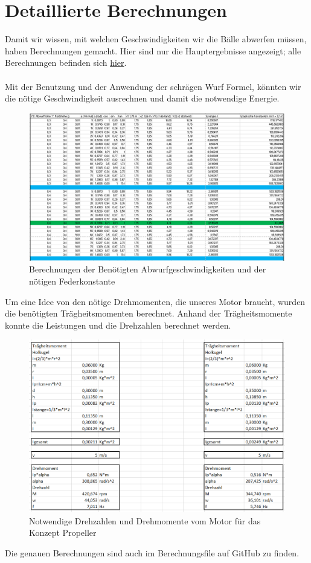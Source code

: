 \section{Detaillierte Berechnungen}
\label{anhang-Berechnungen}
Damit wir wissen, mit welchen Geschwindigkeiten wir die Bälle abwerfen müssen, haben Berechnungen gemacht.
Hier sind nur die Hauptergebnisse angezeigt; alle Berechnungen befinden sich \href{https://github.com/accefa/doku/tree/master/bin/Berechnungen.xlsx}{hier}. \\ \\
Mit der Benutzung und der Anwendung der schrägen Wurf Formel, könnten wir die nötige Geschwindigkeit ausrechnen und damit die notwendige Energie.
\begin{figure}[h!]
	\centering
	\includegraphics[width=1\textwidth]{../../fig/Geschwindigkeit_und_eleastische_Konstante.png}
	\caption{Berechnungen der Benötigten Abwurfgeschwindigkeiten und der nötigen Federkonstante}
	\label{fig:Berechnungen von die Geschwindigkeit}
\end{figure}
\newpage
Um eine Idee von den nötige Drehmomenten, die unseres Motor braucht, wurden die benötigten Trägheitsmomenten berechnet. Anhand der Trägheitsmomente konnte die Leistungen und die Drehzahlen berechnet werden.
\begin{figure}[h!]
	\centering
	\includegraphics[width=1\textwidth]{../../fig/Berechnungen_Propeller.png}
	\caption{Notwendige Drehzahlen und Drehmomente vom Motor für das Konzept Propeller}
	\label{fig:Berechnungen für der Propellerkonzept}
\end{figure}

Die genauen Berechnungen sind auch im Berechnungsfile auf GitHub zu finden. 